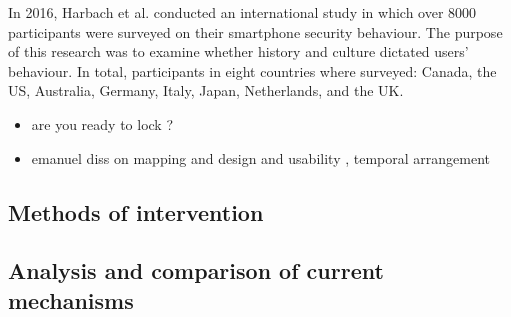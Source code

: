 In 2016, Harbach et al. conducted an international study in which over 8000 participants were surveyed on their smartphone security behaviour. The purpose of this research was to examine whether history and culture dictated users' behaviour. In total, participants in eight countries where surveyed: Canada, the US, Australia, Germany, Italy, Japan, Netherlands, and the UK.


\begin{itemize}

    \item are you ready to lock ?
    \item emanuel diss on mapping and design and usability , temporal arrangement 
\end{itemize}


\subsection{Methods of intervention}

\subsection{Analysis and comparison of current mechanisms}




